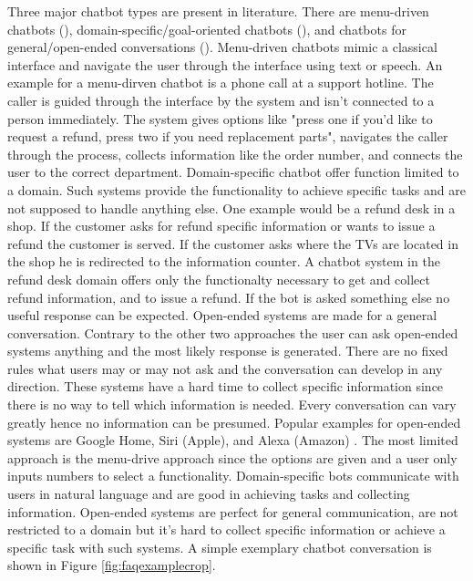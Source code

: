 Three major chatbot types are present in literature.
There are menu-driven chatbots (\citet{singhbuilding}), domain-specific/goal-oriented chatbots (\citet{deshpande2017survey, luis2015williams, braunEvaluatingNLU, williams2017hybrid}),
and chatbots for general/open-ended conversations (\citet{brandtzaeg2018chatbots, singhbuilding}).
Menu-driven chatbots mimic a classical interface and navigate the user through the 
interface using text or speech.
An example for a menu-dirven chatbot is a phone call at a support hotline.
The caller is guided through the interface by the system and isn't connected to a person immediately.
The system gives options like "press one if you'd like to request a refund, press two 
if you need replacement parts", navigates the caller through the process, collects information like the order number, and 
connects the user to the correct department.
Domain-specific chatbot offer function limited to a domain.
Such systems provide the functionality to achieve specific tasks and are not supposed to handle anything else.
One example would be a refund desk in a shop.
If the customer asks for refund specific information or wants to issue a refund the customer is served.
If the customer asks where the TVs are located in the shop he is redirected to the information counter.
A chatbot system in the refund desk domain offers only the functionalty necessary to get and collect refund information, 
and to issue a refund. If the bot is asked something else no useful response can be expected.
Open-ended systems are made for a general conversation.
Contrary to the other two approaches the user can ask open-ended systems anything and the most likely response is generated.
There are no fixed rules what users may or may not ask and the conversation can develop in any direction.
These systems have a hard time to collect specific information since there is no way to tell which information is needed.
Every conversation can vary greatly hence no information can be presumed.
Popular examples for open-ended systems are Google Home, Siri (Apple), and Alexa (Amazon) \cite{singhbuilding}.
The most limited approach is the menu-drive approach since the options are given and a user only inputs numbers to select a functionality.
Domain-specific bots communicate with users in natural language and are good in achieving tasks and collecting information.
Open-ended systems are perfect for general communication, are not restricted to a domain but it's hard to collect specific information
or achieve a specific task with such systems.
A simple exemplary chatbot conversation is shown in Figure \ref{fig:faqexamplecrop}.

